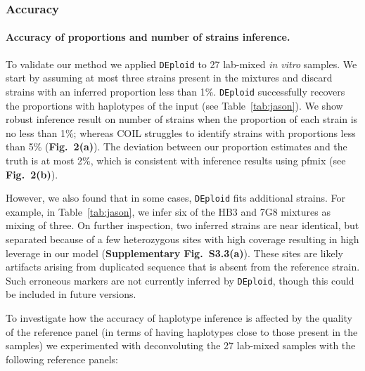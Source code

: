 \documentclass{nature}
\begin{document}
\subsubsection*{Accuracy}

\paragraph{Accuracy of proportions and number of strains inference.}
To validate our method we applied \texttt{DEploid} to 27 lab-mixed {\it in vitro} samples. We start by assuming at most three strains present in the mixtures and discard strains with an inferred proportion less than 1\%. \texttt{DEploid} successfully recovers the proportions with haplotypes of the input (see Table~\ref{tab:jason}). We show robust inference result on number of strains when the proportion of each strain is no less than 1\%; whereas COIL struggles to identify strains with proportions less than 5\% ({\bf Fig.~2(a)}). The deviation between our proportion estimates and the truth is at most 2\%, which is consistent with inference results using pfmix (see {\bf Fig.~2(b)}).

However, we also found that in some cases, \texttt{DEploid} fits additional strains. For example, in Table~\ref{tab:jason}, we infer six of the HB3 and 7G8 mixtures as mixing of three.  On further inspection, two inferred strains are near identical, but separated because of a few heterozygous sites with high coverage resulting in high leverage in our model ({\bf Supplementary Fig.~S3.3(a)}). These sites are likely artifacts arising from duplicated sequence that is absent from the reference strain.  Such erroneous markers are not currently inferred by \texttt{DEploid}, though this could be included in future versions.

To investigate how the accuracy of haplotype inference is affected by the quality of the reference panel (in terms of having haplotypes close to those present in the samples) we experimented with deconvoluting the 27 lab-mixed samples with the following reference panels:
\end{document}
